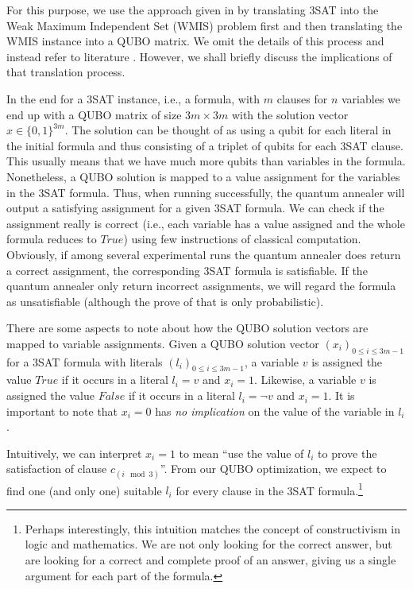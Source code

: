For this purpose, we use the approach given in \cite{choi2010adiabatic,choi2011different} by translating 3SAT into the Weak Maximum Independent Set (WMIS) problem first and then translating the WMIS instance into a QUBO matrix. We omit the details of this process and instead refer to literature \cite{choi2010adiabatic,choi2011different,lucas2014ising}. However, we shall briefly discuss the implications of that translation process.

In the end for a 3SAT instance, i.e., a formula, with $m$ clauses for $n$ variables we end up with a QUBO matrix of size $3m \times 3m$ with the solution vector $x \in \{0,1\}^{3m}$. The solution can be thought of as using a qubit for each literal in the initial formula and thus consisting of a triplet of qubits for each 3SAT clause. This usually means that we have much more qubits than variables in the formula. Nonetheless, a QUBO solution is mapped to a value assignment for the variables in the 3SAT formula. Thus, when running successfully, the quantum annealer will output a satisfying assignment for a given 3SAT formula. We can check if the assignment really is correct (i.e., each variable has a value assigned and the whole formula reduces to $\textit{True}$) using few instructions of classical computation. Obviously, if among several experimental runs the quantum annealer does return a correct assignment, the corresponding 3SAT formula is satisfiable. If the quantum annealer only return incorrect assignments, we will regard the formula as unsatisfiable (although the prove of that is only probabilistic).

There are some aspects to note about how the QUBO solution vectors are mapped to variable assignments. Given a QUBO solution vector $(x_i)_{0 \leq i \leq 3m-1}$ for a 3SAT formula with literals $(l_i)_{0 \leq i \leq 3m-1}$, a variable $v$ is assigned the value $\textit{True}$ if it occurs in a literal $l_i = v$ and $x_i = 1$. Likewise, a variable $v$ is assigned the value $\textit{False}$ if it occurs in a literal $l_i = \lnot v$ and $x_i = 1$. It is important to note that $x_i = 0$ has \emph{no implication} on the value of the variable in $l_i$.

Intuitively, we can interpret $x_i = 1$ to mean ``use the value of $l_i$ to prove the satisfaction of clause $c_{(i \mod 3)}$''. From our QUBO optimization, we expect to find one (and only one) suitable $l_i$ for every clause in the 3SAT formula.\footnote{Perhaps interestingly, this intuition matches the concept of constructivism in logic and mathematics. We are not only looking for the correct answer, but are looking for a correct and complete proof of an answer, giving us a single argument for each part of the formula.}


